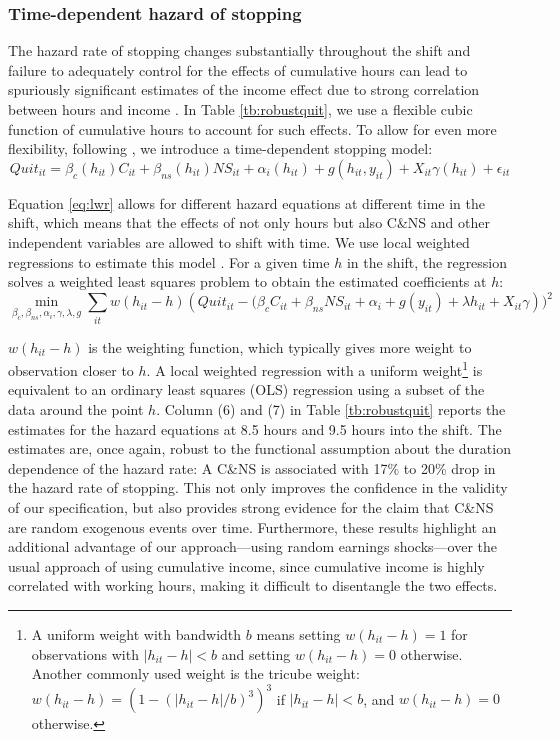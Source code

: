 \documentclass[reviewmode,AEJ]{AEA}
\begin{document}
\subsubsection{Time-dependent hazard of stopping}
The hazard rate of stopping changes substantially throughout the shift and failure to adequately control for the effects of cumulative hours can lead to spuriously significant estimates of the income effect due to strong correlation between hours and income \citep{thakral2018daily}. In Table \ref{tb:robustquit}, we use a flexible cubic function of cumulative hours to account for such effects. To allow for even more flexibility, following \cite{thakral2018daily}, we introduce a time-dependent stopping model:
\begin{equation}
\label{eq:lwr}
    Quit_{it} = \beta_c(h_{it})C_{it} + \beta_{ns}(h_{it}){NS}_{it} + \alpha_i(h_{it}) + g(h_{it}, y_{it}) + X_{it}\gamma(h_{it}) + \epsilon_{it}
\end{equation}

Equation \eqref{eq:lwr} allows for different hazard equations at different time in the shift, which means that the effects of not only hours but also C\&NS and other independent variables are allowed to shift with time. We use local weighted regressions to estimate this model \citep{cleveland1988locally}. For a given time $h$ in the shift, the regression solves a weighted least squares problem to obtain the estimated coefficients at $h$:
\[\min_{\beta_c, \beta_{ns}, \alpha_i, \gamma, \lambda, g} \sum_{it} w(h_{it}-h) \left(Quit_{it} - (\beta_cC_{it} + \beta_{ns}{NS}_{it} + \alpha_i + g(y_{it}) + \lambda h_{it} + X_{it}\gamma\right))^2\]

$w(h_{it}-h)$ is the weighting function, which typically gives more weight to observation closer to $h$. A local weighted regression with a uniform weight\footnote{A uniform weight with bandwidth $b$ means setting $w(h_{it}-h) = 1$ for observations with $|h_{it}-h|<b$ and setting $w(h_{it}-h) = 0$ otherwise. Another commonly used weight is the tricube weight: $w(h_{it}-h) = \left(1-(|h_{it}-h|/b)^3\right)^3$ if $|h_{it}-h|<b$, and $w(h_{it}-h) = 0$ otherwise.} is equivalent to an ordinary least squares (OLS) regression using a subset of the data around the point $h$. Column (6) and (7) in Table \ref{tb:robustquit} reports the estimates for the hazard equations at 8.5 hours and 9.5 hours into the shift. The estimates are, once again, robust to the functional assumption about the duration dependence of the hazard rate: A C\&NS is associated with 17\% to 20\% drop in the hazard rate of stopping.  This not only improves the confidence in the validity of our specification, but also provides strong evidence for the claim that C\&NS are random exogenous events over time. Furthermore, these results highlight an additional advantage of our approach---using random earnings shocks---over the usual approach of using cumulative income, since cumulative income is highly correlated
with working hours, making it difficult to disentangle the two effects.  
\end{document}
